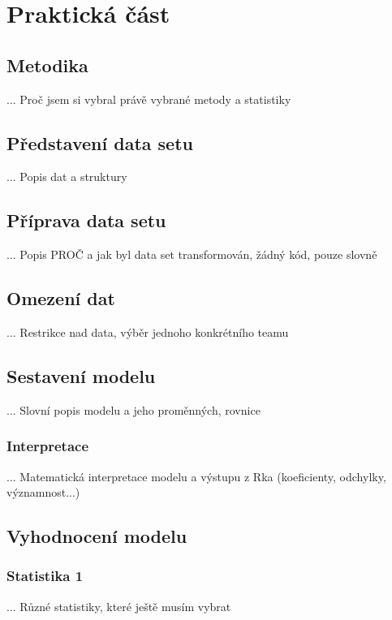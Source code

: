 \chapter{Praktická část}
\section{Metodika}
... Proč jsem si vybral právě vybrané metody a statistiky

\section{Představení data setu}
... Popis dat a struktury

\section{Příprava data setu}
... Popis PROČ a jak byl data set transformován, žádný kód, pouze slovně

\section{Omezení dat}
... Restrikce nad data, výběr jednoho konkrétního teamu

\section{Sestavení modelu}
... Slovní popis modelu a jeho proměnných, rovnice

\subsection{Interpretace}
... Matematická interpretace modelu a výstupu z Rka (koeficienty, odchylky, významnost...)

\section{Vyhodnocení modelu}
\subsection{Statistika 1}
... Různé statistiky, které ještě musím vybrat
